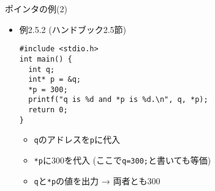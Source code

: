 \begin{frame}[t,fragile]{ポインタの例(2)}
  \begin{itemize}
  \item 例2.5.2 (ハンドブック2.5節)
\begin{lstlisting}
#include <stdio.h>
int main() {
  int q;
  int* p = &q;
  *p = 300;
  printf("q is %d and *p is %d.\n", q, *p);
  return 0;
}
\end{lstlisting}
\begin{itemize}
\item \verb+q+のアドレスを\verb+p+に代入
\item \verb+*p+に300を代入 (ここで\verb+q=300;+と書いても等価)
\item \verb+q+と\verb+*p+の値を出力 → 両者とも300
\end{itemize}
  \end{itemize}
\end{frame}
